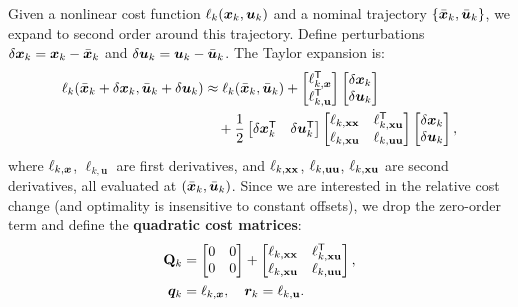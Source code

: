 Given a nonlinear cost function $\ell_k(\bm{x}_k,\bm{u}_k)$ and a nominal trajectory $\{\bar{\bm{x}}_k, \bar{\bm{u}}_k\}$,
we expand to second order around this trajectory. Define perturbations $\delta\bm{x}_k = \bm{x}_k - \bar{\bm{x}}_k$ and
$\delta\bm{u}_k = \bm{u}_k - \bar{\bm{u}}_k$. The Taylor expansion is:
\begin{align}
\ell_k(\bar{\bm{x}}_k + \delta\bm{x}_k, \bar{\bm{u}}_k + \delta\bm{u}_k) &\approx \ell_k(\bar{\bm{x}}_k, \bar{\bm{u}}_k)
+ \left[\begin{matrix} \ell_{k,\bm{x}}^{\mathsf{T}} \\ \ell_{k,\mathbf{u}}^{\mathsf{T}} \end{matrix}\right] \left[\begin{matrix} \delta\bm{x}_k \\ \delta\bm{u}_k \end{matrix}\right] \notag \\
&\quad + \frac{1}{2} \left[\begin{matrix} \delta\bm{x}_k^{\mathsf{T}} & \delta\bm{u}_k^{\mathsf{T}} \end{matrix}\right]
\left[\begin{matrix} \ell_{k,\mathbf{x}\mathbf{x}} & \ell_{k,\mathbf{x}\mathbf{u}}^{\mathsf{T}} \\ \ell_{k,\mathbf{x}\mathbf{u}} & \ell_{k,\mathbf{u}\mathbf{u}} \end{matrix}\right]
\left[\begin{matrix} \delta\bm{x}_k \\ \delta\bm{u}_k \end{matrix}\right],
\label{eq:ch5:cost-expansion}
\end{align}
where $\ell_{k,\bm{x}}$, $\ell_{k,\mathbf{u}}$ are first derivatives, and $\ell_{k,\mathbf{x}\mathbf{x}}$, $\ell_{k,\mathbf{u}\mathbf{u}}$, $\ell_{k,\mathbf{x}\mathbf{u}}$
are second derivatives, all evaluated at $(\bar{\bm{x}}_k, \bar{\bm{u}}_k)$. Since we are interested in the relative
cost change (and optimality is insensitive to constant offsets), we drop the zero-order term and define
the \textbf{quadratic cost matrices}:
\begin{align}
\mathbf{Q}_k &= \begin{bmatrix} 0 & 0 \\ 0 & 0 \end{bmatrix} + \begin{bmatrix} \ell_{k,\mathbf{x}\mathbf{x}} & \ell_{k,\mathbf{x}\mathbf{u}}^{\mathsf{T}} \\ \ell_{k,\mathbf{x}\mathbf{u}} & \ell_{k,\mathbf{u}\mathbf{u}} \end{bmatrix}, \label{eq:ch5:Q-def}\\
\bm{q}_k &= \ell_{k,\bm{x}}, \quad \bm{r}_k = \ell_{k,\mathbf{u}}. \label{eq:ch5:q-r-def}
\end{align}

